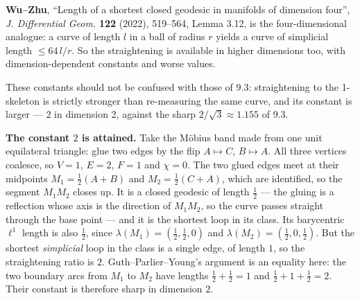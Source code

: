 \documentclass[
]{article}
\begin{document}
\textbf{Wu--Zhu}, ``Length of a shortest closed geodesic in manifolds of
dimension four'', \emph{J. Differential Geom.} \textbf{122} (2022),
519--564, Lemma 3.12, is the four-dimensional analogue: a curve of
length \(l\) in a ball of radius \(r\) yields a curve of simplicial
length \(\le64\,l/r\). So the straightening is available in higher
dimensions too, with dimension-dependent constants and worse values.

These constants should not be confused with those of 9.3: straightening
to the 1-skeleton is strictly stronger than re-measuring the same curve,
and its constant is larger --- \(2\) in dimension 2, against the sharp
\(2/\sqrt3\approx1.155\) of 9.3.

\textbf{The constant \(2\) is attained.} Take the M\"{o}bius band made
from one unit equilateral triangle: glue two edges by the flip
\(A\mapsto C\), \(B\mapsto A\). All three vertices coalesce, so \(V=1\),
\(E=2\), \(F=1\) and \(\chi=0\). The two glued edges meet at their
midpoints \(M_1=\tfrac12(A+B)\) and \(M_2=\tfrac12(C+A)\), which are
identified, so the segment \(M_1M_2\) closes up. It is a closed geodesic
of length \(\tfrac12\) --- the gluing is a reflection whose axis is the
direction of \(M_1M_2\), so the curve passes straight through the base
point --- and it is the shortest loop in its class. Its barycentric
\(\ell^1\) length is also \(\tfrac12\), since
\(\lambda(M_1)=(\tfrac12,\tfrac12,0)\) and
\(\lambda(M_2)=(\tfrac12,0,\tfrac12)\). But the shortest
\emph{simplicial} loop in the class is a single edge, of length \(1\),
so the straightening ratio is \(2\). Guth--Parlier--Young's argument is
an equality here: the two boundary arcs from \(M_1\) to \(M_2\) have
lengths \(\tfrac12+\tfrac12=1\) and \(\tfrac12+1+\tfrac12=2\). Their
constant is therefore sharp in dimension \(2\).
\end{document}
